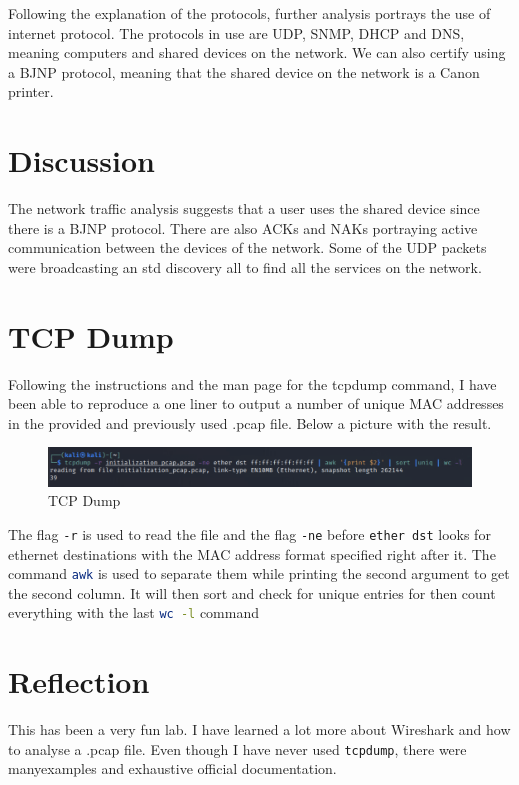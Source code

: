 Following the explanation of the protocols, further analysis portrays the use of
internet protocol. The protocols in use are UDP, SNMP, DHCP and DNS, meaning
computers and shared devices on the network. We can also certify using a BJNP
protocol, meaning that the shared device on the network is a Canon printer.

\section{Discussion}
\label{s:Lab1-Discussion}
The network traffic analysis suggests that a user uses the shared device since
there is a BJNP protocol. There are also ACKs and NAKs portraying active
communication between the devices of the network.
Some of the UDP packets were broadcasting an std discovery all to find
all the services on the network.

\section{TCP Dump}
\label{s:TCP-Dump}
Following the instructions and the man page for the tcpdump command, I have been able
to reproduce a one liner to output a number of unique MAC addresses in the provided and previously
used .pcap file. Below a picture with the result.

\begin{figure}[ht]
  \centering
  \includegraphics[width=1\textwidth]{figures/tcpdump}
  \caption{TCP Dump}
  \label{f:tcpdump}
\end{figure}

The flag \lstinline[language=bash]!-r! is used to read the file and the flag
\lstinline[language=bash]!-ne! before \lstinline[language=bash]!ether dst! looks
for ethernet destinations with the MAC address format specified right after it.
The command \lstinline[language=bash]!awk! is used to separate them while printing the
second argument to get the second column. It will then sort and check for unique
entries for then count everything with the last \lstinline[language=bash]!wc -l! command

\section{Reflection}
\label{s:Lab1-Reflection}
This has been a very fun lab. I have learned a lot more about Wireshark and how
to analyse a .pcap file. Even though I have never used
\lstinline[language=bash]!tcpdump!, there were manyexamples and exhaustive
official documentation.
